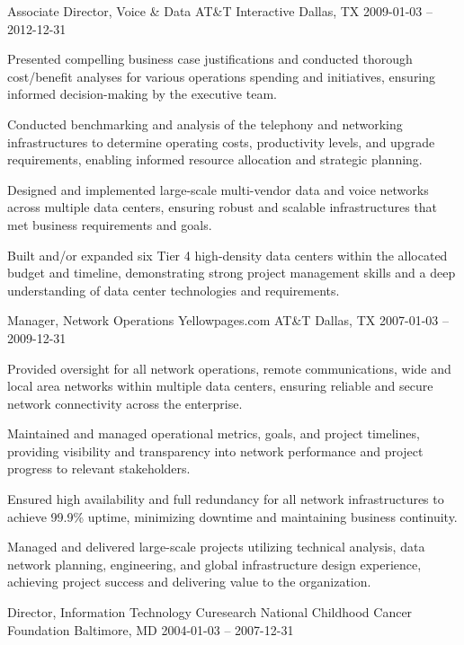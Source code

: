 \documentclass[]{awesome-cv}
\begin{document}
\begin{cventries}
	\cventry
	{Associate Director, Voice \& Data}
	{AT\&T Interactive}
	{Dallas, TX}
	{2009-01-03 – 2012-12-31}
	{\begin{cvitems}
		\item {Presented compelling business case justifications and conducted thorough cost/benefit analyses for various operations spending and initiatives, ensuring informed decision-making by the executive team.}
		\item {Conducted benchmarking and analysis of the telephony and networking infrastructures to determine operating costs, productivity levels, and upgrade requirements, enabling informed resource allocation and strategic planning.}
		\item {Designed and implemented large-scale multi-vendor data and voice networks across multiple data centers, ensuring robust and scalable infrastructures that met business requirements and goals.}
		\item {Built and/or expanded six Tier 4 high-density data centers within the allocated budget and timeline, demonstrating strong project management skills and a deep understanding of data center technologies and requirements.}
		\end{cvitems}}
	\cventry
	{Manager, Network Operations}
	{Yellowpages.com \textbar{} AT\&T}
	{Dallas, TX}
	{2007-01-03 – 2009-12-31}
	{\begin{cvitems}
		\item {Provided oversight for all network operations, remote communications, wide and local area networks within multiple data centers, ensuring reliable and secure network connectivity across the enterprise.}
		\item {Maintained and managed operational metrics, goals, and project timelines, providing visibility and transparency into network performance and project progress to relevant stakeholders.}
		\item {Ensured high availability and full redundancy for all network infrastructures to achieve 99.9\% uptime, minimizing downtime and maintaining business continuity.}
		\item {Managed and delivered large-scale projects utilizing technical analysis, data network planning, engineering, and global infrastructure design experience, achieving project success and delivering value to the organization.}
		\end{cvitems}}
	\cventry
	{Director, Information Technology}
	{Curesearch \textbar{} National Childhood Cancer Foundation}
	{Baltimore, MD}
	{2004-01-03 – 2007-12-31}

\end{cventries}
\end{document}
